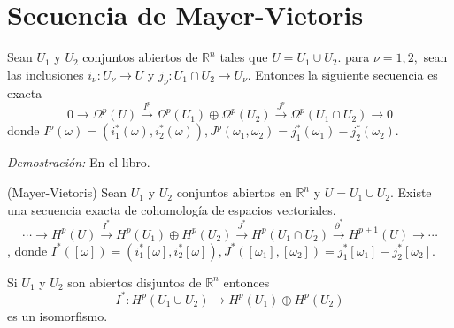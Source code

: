 \chapter{Secuencia de Mayer-Vietoris}

\begin{Teo}
Sean $U_1$ y $U_2$ conjuntos abiertos de $\mathbb{R}^n$ tales que $U=U_1\cup U_2$. para $\nu=1,2, $ sean las inclusiones $i_\nu:U_\nu \rightarrow U $ y $j_\nu:U_1\cap U_2\rightarrow U_\nu$. Entonces la siguiente secuencia es exacta
$$0\rightarrow \Omega^p(U)\xrightarrow{I^p}\Omega^p(U_1)\oplus \Omega^p(U_2)\xrightarrow{J^p} \Omega^p(U_1\cap U_2)\rightarrow 0 $$
donde $I^p(\omega)=(i_1^*(\omega),i_2^*(\omega)), J^p(\omega_1,\omega_2)=j_1^*(\omega_1)-j_2^*(\omega_2)$. 
\end{Teo}

\textit{Demostración:} En el libro.

\begin{Teo}
  (Mayer-Vietoris) Sean $U_1$ y $U_2$ conjuntos abiertos en $\mathbb{R}^n$ y $U=U_1\cup U_2$. Existe una secuencia exacta de cohomología de espacios vectoriales.
$$\cdots \rightarrow H^p(U)\xrightarrow{I^*}H^p(U_1)\oplus H^p(U_2)\xrightarrow{J^*}H^p(U_1\cap U_2)\xrightarrow{\partial^*}H^{p+1}(U)\rightarrow \cdots $$
, donde $I^*([\omega])=(i_1^*[\omega],i_2^*[\omega]), J^*([\omega_1],[\omega_2])=j_1^*[\omega_1]-j_2^*[\omega_2]$. 
\end{Teo}

\begin{Cor}
  Si $U_1$ y $U_2$ son abiertos disjuntos de $\mathbb{R}^n$ entonces
 $$I^*:H^p(U_1\cup U_2)\rightarrow H^p(U_1)\oplus H^p(U_2) $$
 es un isomorfismo.
\end{Cor}

